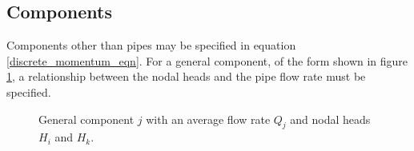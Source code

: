 

\subsection{Components}

Components other than pipes may be specified in equation \eqref{discrete_momentum_eqn}. For a general component, of the form shown in figure \ref{fig:general_component}, a relationship between the nodal heads and the pipe flow rate must be specified. 

\begin{figure}
\centering
{} 
\caption{General component $j$ with an average flow rate $Q_j$ and nodal heads $H_i$ and $H_k$.}
\label{fig:general_component}
\end{figure}


%









